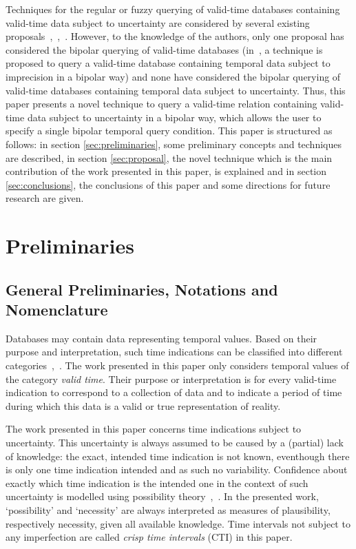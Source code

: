 \documentclass[runningheads,a4paper]{llncs}
\begin{document}
Techniques for the regular or fuzzy querying of valid-time databases containing valid-time data subject to uncertainty are considered by several existing proposals~\cite{Pons2012ijcis},~\cite{Pons2012ipmu},~\cite{Pons2013ijufkbs}. However, to the knowledge of the authors, only one proposal has considered the bipolar querying of valid-time databases (in~\cite{Billiet2011fqas}, a technique is proposed to query a valid-time database containing temporal data subject to imprecision in a bipolar way) and none have considered the bipolar querying of valid-time databases containing temporal data subject to uncertainty. Thus, this paper presents a novel technique to query a valid-time relation containing valid-time data subject to uncertainty in a bipolar way, which allows the user to specify a single bipolar temporal query condition. This paper is structured as follows: in section \ref{sec:preliminaries}, some preliminary concepts and techniques are described, in section \ref{sec:proposal}, the novel technique which is the main contribution of the work presented in this paper, is explained and in section \ref{sec:conclusions}, the conclusions of this paper and some directions for future research are given.


\section{Preliminaries\label{sec:preliminaries}}

\subsection{General Preliminaries, Notations and Nomenclature}
Databases may contain data representing temporal values. Based on their purpose and interpretation, such time indications can be classified into different categories~\cite{Bohlen1998lncs},~\cite{Billiet2012ipmu}. The work presented in this paper only considers temporal values of the category \emph{valid time}. Their purpose or interpretation is for every valid-time indication to correspond to a collection of data and to indicate a period of time during which this data is a valid or true representation of reality.

The work presented in this paper concerns time indications subject to uncertainty. This uncertainty is always assumed to be caused by a (partial) lack of knowledge: the exact, intended time indication is not known, eventhough there is only one time indication intended and as such no variability. Confidence about exactly which time indication is the intended one in the context of such uncertainty is modelled using possibility theory~\cite{Pons2013ijufkbs},~\cite{Dubois1988}. In the presented work, `possibility' and `necessity' are always interpreted as measures of plausibility, respectively necessity, given all available knowledge. Time intervals not subject to any imperfection are called \emph{crisp time intervals} (CTI) in this paper.
\end{document}
